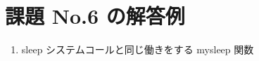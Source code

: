 \documentclass[a4j,twcolumn,11pt,nomag]{ltjarticle}      %
\begin{document}
\onecolumn

\section*{課題 No.6 の解答例}
\begin{enumerate}


\item sleep システムコールと同じ働きをする mysleep 関数
\end{enumerate}
\end{document}
